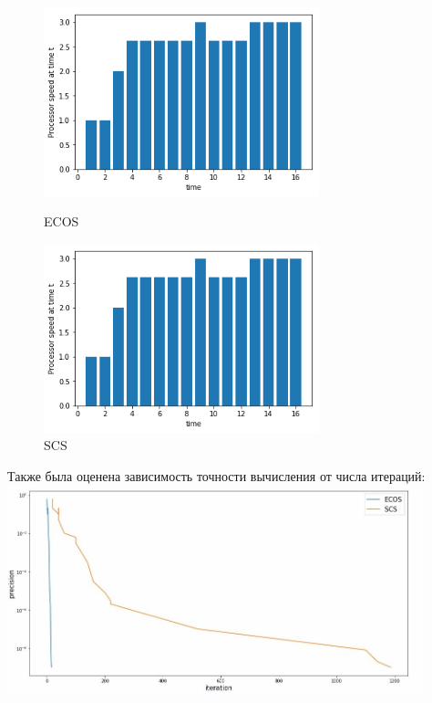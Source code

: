 \documentclass{article}
\begin{document}
\begin{figure}[h]
\begin{center}
\begin{minipage}[h]{8cm}
\includegraphics[width=8cm]{ECOS_3.png}
\caption{ECOS} %
\label{ris:experimoriginal} %
\end{minipage}
\hfill 
\begin{minipage}[h]{8cm}
\includegraphics[width=8cm]{SCS_3.png}
\caption{SCS}
\label{ris:experimcoded}
\end{minipage}
\end{center}
\end{figure}

Также была оценена зависимость точности вычисления от числа итераций:\\

\includegraphics[width=12cm]{cmp.jpg}
\end{document}
